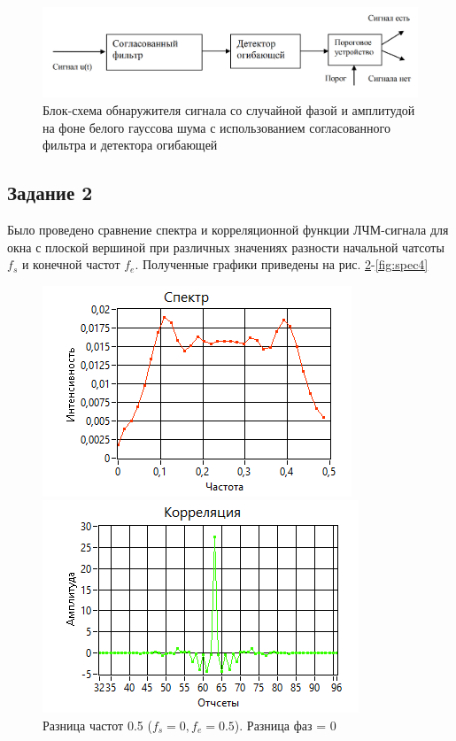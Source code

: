 \begin{figure}[h!]
	\centering
	\includegraphics[width =0.8\linewidth]{imgs/scheme3.png}
	\caption{Блок-схема обнаружителя сигнала со случайной фазой и амплитудой на фоне
    белого гауссова шума с использованием согласованного фильтра и детектора огибающей}
	\label{fig:scheme3}
\end{figure}

\subsection{Задание 2}
Было проведено сравнение спектра и корреляционной функции ЛЧМ-сигнала для окна с
плоской вершиной при различных значениях разности начальной чатсоты $f_{s}$ и
конечной частот $f_{e}$. Полученные графики приведены на рис. \ref{fig:spec1}-\ref{fig:spec4}

\begin{figure}[H]
    \centering
    \begin{minipage}{0.49\linewidth}
        \includegraphics[width =0.9\linewidth]{imgs/spec1.png}
    \end{minipage}
    \begin{minipage}{0.49\linewidth}
        \includegraphics[width =0.9\linewidth]{imgs/corr1.png}
    \end{minipage}
	\caption{Разница частот 0.5 ($f_{s}=0, f_{e}=0.5$). Разница фаз = 0}
	\label{fig:spec1}
\end{figure}

